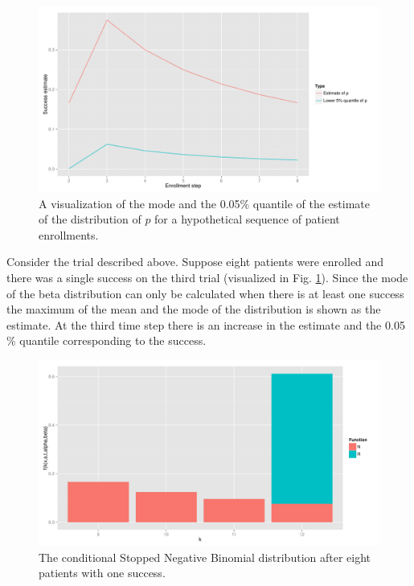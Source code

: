 \documentclass[12pt]{article}         %
\begin{document}
\begin{figure}[ht]
\includegraphics[width=\textwidth]{hypo_traj.pdf}
\caption{
A visualization of the mode and the 0.05\% quantile of the estimate of the distribution of $p$ for a hypothetical sequence of patient enrollments.
}
\label{fig:hypo}
\end{figure}

Consider the trial described above. Suppose eight patients were enrolled and there was a single success on the third trial (visualized in Fig. \ref{fig:hypo}). Since the mode of the beta distribution can only be calculated when there is at least one success the maximum of the mean and the mode of the distribution is shown as the estimate. At the third time step there is an increase in the estimate and the 0.05 \% quantile corresponding to the success. 

\begin{figure}[ht]
\includegraphics[width=\textwidth]{conditional_snb.pdf}
\caption{
The conditional Stopped Negative Binomial distribution after eight patients with one success.
}
\label{fig:conditional_snb}
\end{figure}
\end{document}
